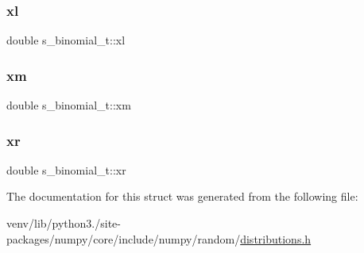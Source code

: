 \mbox{\label{structs__binomial__t_aa46efb684fd21a1b8a8d7a5268b65371}} 
\subsubsection{\texorpdfstring{xl}{xl}}
{\footnotesize\ttfamily double s\+\_\+binomial\+\_\+t\+::xl}

\mbox{\label{structs__binomial__t_ab136362574228316fc915f4ffd747cda}} 
\subsubsection{\texorpdfstring{xm}{xm}}
{\footnotesize\ttfamily double s\+\_\+binomial\+\_\+t\+::xm}

\mbox{\label{structs__binomial__t_af6cd0e49cf8b3b345557099657953c03}} 
\subsubsection{\texorpdfstring{xr}{xr}}
{\footnotesize\ttfamily double s\+\_\+binomial\+\_\+t\+::xr}



The documentation for this struct was generated from the following file\+:\begin{DoxyCompactItemize}
\item 
venv/lib/python3./site-\/packages/numpy/core/include/numpy/random/\hyperlink{distributions_8h}{distributions.\+h}\end{DoxyCompactItemize}
